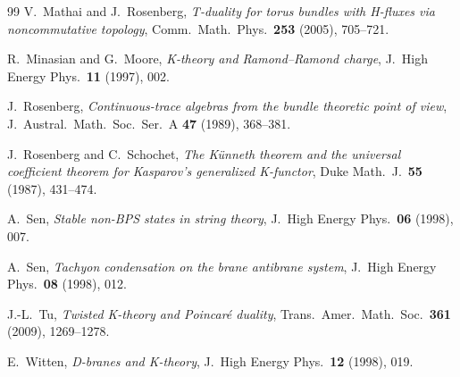 \documentclass[reqno,11pt]{amsart}
\theoremstyle{definition}
\begin{document}
{\begin{thebibliography}{99}
V.~Mathai and J.~Rosenberg,
\emph{T-duality for torus bundles with H-fluxes via noncommutative topology},
Comm.\ Math.\ Phys.\ \textbf{253} (2005), 705--721.

R.~Minasian and G.~Moore,
\emph{K-theory and Ramond--Ramond charge},
J.\ High Energy Phys.\ \textbf{11} (1997), 002.

J.~Rosenberg,
\emph{Continuous-trace algebras from the bundle theoretic point of view},
J.\ Austral.\ Math.\ Soc.\ Ser.\ A \textbf{47} (1989), 368--381.

J.~Rosenberg and C.~Schochet,
\emph{The K\"unneth theorem and the universal coefficient theorem for Kasparov's generalized K-functor},
Duke Math.\ J.\ \textbf{55} (1987), 431--474.

A.~Sen,
\emph{Stable non-BPS states in string theory},
J.\ High Energy Phys.\ \textbf{06} (1998), 007.

A.~Sen,
\emph{Tachyon condensation on the brane antibrane system},
J.\ High Energy Phys.\ \textbf{08} (1998), 012.

J.-L.~Tu,
\emph{Twisted K-theory and Poincar\'e duality},
Trans.\ Amer.\ Math.\ Soc.\ \textbf{361} (2009), 1269--1278.

E.~Witten,
\emph{D-branes and K-theory},
J.\ High Energy Phys.\ \textbf{12} (1998), 019.

\end{thebibliography}}
\end{document}
